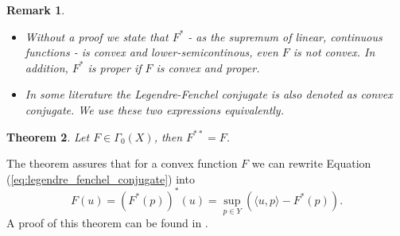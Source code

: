 \documentclass[abstracton]{scrreprt}
\newtheorem{theorem}{Theorem}[chapter]
\newtheorem{remark}[theorem]{Remark}
\begin{document}
        \begin{remark} %
            \begin{itemize}
                \item Without a proof we state that $F^{\ast}$ - as the supremum of linear, continuous functions - is convex and lower-semicontinous, even $F$ is not convex. In addition, $F^{\ast}$ is proper if $F$ is convex and proper.
                \item In some literature the Legendre-Fenchel conjugate is also denoted as convex conjugate. We use these two expressions equivalently.
            \end{itemize}
        \end{remark}
        \begin{theorem} %
            Let $F \in \Gamma_{0}(X)$, then $F^{\ast\ast} = F$.
        \end{theorem}
        The theorem assures that for a convex function $F$ we can rewrite Equation (\ref{eq:legendre_fenchel_conjugate}) into
            $$
                F(u) = \left( F^{\ast}(p) \right)^{\ast}(u) = \sup_{p \in Y} \left( \langle u, p \rangle - F^{\ast}(p) \right).
            $$
        A proof of this theorem can be found in \cite{Rockafellar}.
\end{document}
